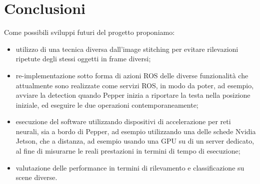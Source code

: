 \section{Conclusioni}

Come possibili sviluppi futuri del progetto proponiamo:
\begin{itemize}
    \item utilizzo di una tecnica diversa dall'image stitching per evitare rilevazioni ripetute degli stessi oggetti in frame diversi;
    \item re-implementazione sotto forma di azioni ROS delle diverse funzionalità che attualmente sono realizzate come servizi ROS, in modo da poter, ad esempio, avviare la detection quando Pepper inizia a riportare la testa nella posizione iniziale, ed eseguire le due operazioni contemporaneamente;
    \item esecuzione del software utilizzando dispositivi di accelerazione per reti neurali, sia a bordo di Pepper, ad esempio utilizzando una delle schede Nvidia Jetson, che a distanza, ad esempio usando una GPU su di un server dedicato, al fine di misurarne le reali prestazioni in termini di tempo di esecuzione;
    \item valutazione delle performance in termini di rilevamento e classificazione su scene diverse.
\end{itemize} 